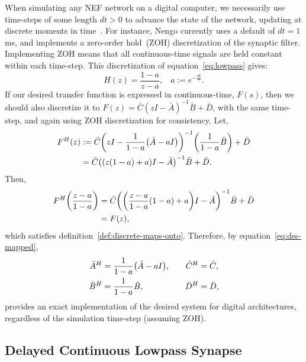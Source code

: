 \documentclass[12pt]{article}
\theoremstyle{definition}
\let\originalleft\left
\let\originalright\right
\renewcommand{\left}{\mathopen{}\mathclose\bgroup\originalleft}
\renewcommand{\right}{\aftergroup\egroup\originalright}
\begin{document}
When simulating any NEF network on a digital computer, we necessarily use time-steps of some length $dt > 0$ to advance the state of the network, updating at discrete moments in time~\citep{bekolay2013nengo}.
For instance, Nengo currently uses a default of $dt = 1$\,ms, and implements a zero-order hold~(ZOH) discretization of the synaptic filter.
Implementing ZOH means that all continuous-time signals are held constant within each time-step.
This discretization of equation~\ref{eq:lowpass} gives:
\begin{equation}
H(z) = \frac{1 - a}{z - a} \text{,} \quad a := e^{-\frac{dt}{\tau}} \text{.} \nonumber
\end{equation}
If our desired transfer function is expressed in continuous-time, $F(s)$, then we should also discretize it to $F(z) = \bar{C} (zI - \bar{A})^{-1} \bar{B} + \bar{D}$, with the same time-step, and again using ZOH discretization for consistency.
Let,
\begin{align*}
F^H(z) &:= \bar{C} \left(zI - \frac{1}{1 - a} \left(\bar{A} - aI \right) \right)^{-1} \left( \frac{1}{1-a}\bar{B} \right) + \bar{D} \\
&= \bar{C} \left( \left(z(1 - a) + a \right)I - \bar{A} \right)^{-1}\bar{B} + \bar{D} \text{.}
\end{align*}
Then, 
\begin{align*}
F^H \left( \frac{z-a}{1-a} \right) &= \bar{C}\left( \left( \frac{z-a}{1-a}(1 - a) + a \right)I - \bar{A} \right)^{-1}\bar{B} + \bar{D} \\
&= F(z) \text{,}
\end{align*}
which satisfies definition~\ref{def:discrete-maps-onto}.
Therefore, by equation~\ref{eq:dss-mapped},\begin{equation} \label{eq:discrete-p3}
\begin{aligned}
\bar{A}^H &= \frac{1}{1 - a} \left(\bar{A} - aI\right) \text{,} & \quad \bar{C}^H &= \bar{C} \text{,} \\
\bar{B}^H &= \frac{1}{1-a}\bar{B} \text{,} & \quad \bar{D}^H &= \bar{D} \text{,}
\end{aligned}
\end{equation}
provides an exact implementation of the desired system for digital architectures, regardless of the simulation time-step (assuming ZOH).

\subsection{Delayed Continuous Lowpass Synapse}
\label{sec:delayed-lowpass}
\end{document}
